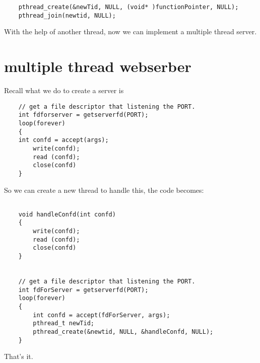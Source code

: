 \documentclass{article}
\begin{document}
\begin{CJK}{UTF8}{gbsn}
\begin{verbatim}
    pthread_create(&newTid, NULL, (void* )functionPointer, NULL);
    pthread_join(newtid, NULL);
\end{verbatim}

    With the help of another thread, now we can implement a multiple thread server.

\section*{multiple thread webserber}

    Recall what we do to create a server is

\begin{verbatim}
    // get a file descriptor that listening the PORT.  
    int fdforserver = getserverfd(PORT); 
    loop(forever)
    {
    int confd = accept(args);
        write(confd);
        read (confd);
        close(confd)
    }
\end{verbatim}

    So we can create a new thread to handle this, the code becomes:

\begin{verbatim}

    void handleConfd(int confd)
    {
        write(confd);
        read (confd);
        close(confd)
    }


    // get a file descriptor that listening the PORT.  
    int fdForServer = getserverfd(PORT); 
    loop(forever)
    {
        int confd = accept(fdForServer, args);
        pthread_t newTid;
        pthread_create(&newtid, NULL, &handleConfd, NULL);
    }
\end{verbatim}

    That's it.

\end{CJK}
\end{document}
